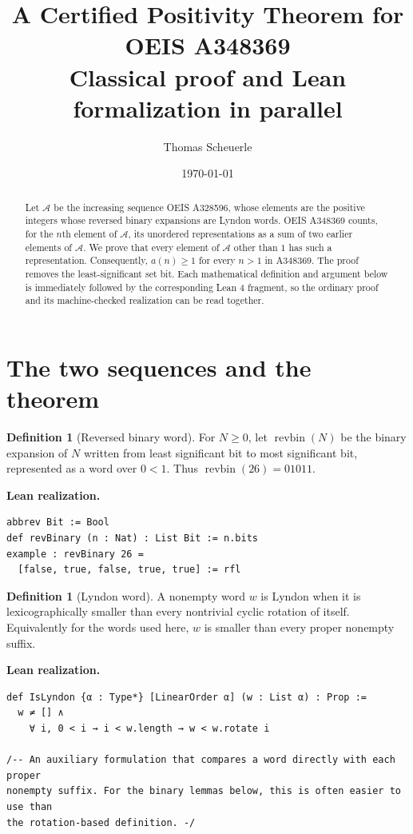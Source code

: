 \documentclass[11pt]{article}
\title{A Certified Positivity Theorem for OEIS A348369\\
\large Classical proof and Lean formalization in parallel}
\author{Thomas Scheuerle}
\date{\today}
\theoremstyle{definition}
\newtheorem{definition}[theorem]{Definition}
\theoremstyle{remark}
\newenvironment{leanbridge}{%
  \par\smallskip\noindent\textbf{Lean realization.}\par\smallskip%
}{%
  \par\smallskip%
}
\newcommand{\SeqA}{\mathcal{A}}
\newcommand{\revbin}{\operatorname{revbin}}
\begin{document}
\maketitle

\begin{abstract}
Let $\SeqA$ be the increasing sequence OEIS A328596, whose elements are the
positive integers whose reversed binary expansions are Lyndon words.  OEIS
A348369 counts, for the $n$th element of $\SeqA$, its unordered representations
as a sum of two earlier elements of $\SeqA$.  We prove that every element of
$\SeqA$ other than $1$ has such a representation.  Consequently,
$a(n)\geq 1$ for every $n>1$ in A348369.  The proof removes the
least-significant set bit.  Each mathematical definition and argument below
is immediately followed by the corresponding Lean 4 fragment, so the
ordinary proof and its machine-checked realization can be read together.
\end{abstract}

\section{The two sequences and the theorem}

\begin{definition}[Reversed binary word]
For $N\geq0$, let $\revbin(N)$ be the binary expansion of $N$ written from
least significant bit to most significant bit, represented as a word over
$0<1$.  Thus $\revbin(26)=01011$.
\end{definition}
\begin{leanbridge}
\begin{lstlisting}
abbrev Bit := Bool
def revBinary (n : Nat) : List Bit := n.bits
example : revBinary 26 =
  [false, true, false, true, true] := rfl
\end{lstlisting}
\end{leanbridge}

\begin{definition}[Lyndon word]
A nonempty word $w$ is Lyndon when it is lexicographically smaller than every
nontrivial cyclic rotation of itself.  Equivalently for the words used here,
$w$ is smaller than every proper nonempty suffix.
\end{definition}
\begin{leanbridge}
\begin{lstlisting}
def IsLyndon {α : Type*} [LinearOrder α] (w : List α) : Prop :=
  w ≠ [] ∧
    ∀ i, 0 < i → i < w.length → w < w.rotate i

/-- An auxiliary formulation that compares a word directly with each proper
nonempty suffix. For the binary lemmas below, this is often easier to use than
the rotation-based definition. -/
\end{lstlisting}
\end{leanbridge}
\end{document}
